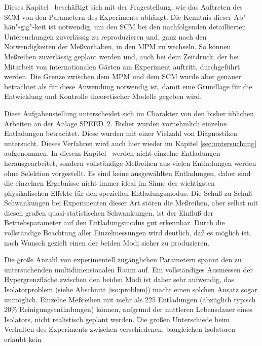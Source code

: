 %
%
\label{sec:betriebsparameter}
%
Dieses Kapitel \thesection\ beschäftigt sich mit der
Fragestellung, wie das Auftreten des SCM von den Parametern des
Experiments abhängt. Die Kenntnis dieser Ab"-hän"-gig"-keit ist
notwendig, um den SCM bei den nachfolgenden detaillierten
Untersuchungen zuverlässig zu reproduzieren und, ganz nach den
Notwendigkeiten der Meßvorhaben, in den MPM zu wechseln. So können
Meßreihen zuverlässig geplant werden und, auch bei dem Zeitdruck,
der bei Mitarbeit von internationalen Gästen am Experiment
auftritt, durchgeführt werden. Die Grenze zwischen dem MPM und dem
SCM wurde aber genauer betrachtet als für diese Anwendung
notwendig ist, damit eine Grundlage für die Entwicklung und
Kontrolle theoretischer Modelle gegeben wird.
\par
Diese Aufgabenstellung unterscheidet sich im Charakter von den bisher
üblichen Arbeiten an der Anlage SPEED~2. Bisher wurden vornehmlich
einzelne Entladungen betrachtet. Diese wurden mit einer Vielzahl von
Diagnostiken untersucht. Dieses Verfahren wird auch hier wieder im
Kapitel \ref{sec:untersuchung} aufgenommen. In diesem Kapitel
\thesection\ werden nicht einzelne Entladungen herausgearbeitet,
sondern vollständige Meßreihen aus vielen Entladungen werden ohne
Selektion vorgestellt. Es sind keine ausgewählten Entladungen, daher
sind die einzelnen Ergebnisse nicht immer ideal im Sinne der
wichtigsten physikalischen Effekte für den speziellen Entladungsmodus.
Die Schuß-zu-Schuß Schwankungen bei Experimenten dieser Art stören die
Meßreihen, aber selbst mit diesen großen quasi-statistischen
Schwankungen, ist der Einfluß der Betriebsparameter auf den
Entladungsmodus gut erkennbar. Durch die vollständige Beachtung aller
Einzelmessungen wird deutlich, daß es möglich ist, nach Wunsch gezielt
einen der beiden Modi sicher zu produzieren.
\par
Die große Anzahl von experimentell zugänglichen Parametern spannt den
zu untersuchenden multidimensionalen Raum auf. Ein vollständiges
Ausmessen der Hypergrenzfläche zwischen den beiden Modi ist daher sehr
aufwendig, das Isolatorproblem (siehe Abschnitt \vref{iso:problem})
macht einen solchen Ansatz sogar unmöglich. Einzelne Meßreihen mit mehr
als 225 Entladungen (abzüglich typisch 20\% Reinigungsentladungen)
können, aufgrund der mittleren Lebensdauer eines Isolators, nicht
realistisch geplant werden. Die großen Unterschiede beim Verhalten des
Experiments zwischen verschiedenen, baugleichen Isolatoren erlaubt kein
